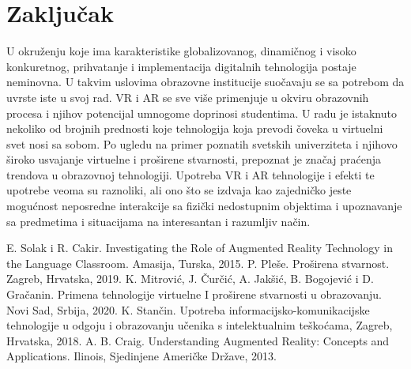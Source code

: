 \documentclass[a4paper]{article}
\begin{document}
	\section{Zaključak}
	\label{sec:Zaključak}
	U okruženju koje ima karakteristike globalizovanog, dinamičnog i visoko  konkuretnog, prihvatanje i implementacija digitalnih 
	tehnologija postaje neminovna. U takvim uslovima obrazovne institucije suočavaju se sa potrebom da uvrste iste u svoj rad. VR i AR se sve više primenjuje
	u okviru obrazovnih procesa i njihov potencijal umnogome doprinosi studentima. U radu je istaknuto nekoliko od brojnih prednosti koje tehnologija koja prevodi
	čoveka u virtuelni svet nosi sa sobom. Po ugledu na primer poznatih svetskih univerziteta i njihovo široko usvajanje virtuelne i proširene stvarnosti, prepoznat 
	je značaj praćenja trendova u obrazovnoj tehnologiji. Upotreba VR i AR tehnologije i efekti te upotrebe veoma su raznoliki, ali ono što se izdvaja kao zajedničko 
	jeste mogućnost neposredne interakcije sa fizički nedostupnim objektima i upoznavanje sa predmetima i situacijama na interesantan i razumljiv način.
	

        
        \begin{thebibliography}{9}
         E. Solak i R. Cakir. Investigating the Role of Augmented Reality Technology in the Language Classroom. Amasija, 
	Turska, 2015.
         P. Pleše. Proširena stvarnost. Zagreb, Hrvatska, 2019.
         K. Mitrović, J. Čurčić, A. Jakšić, B. Bogojević i D. Gračanin. Primena tehnologije virtuelne I proširene 
	stvarnosti u obrazovanju. Novi Sad, Srbija, 2020.
         K. Stančin. Upotreba informacijsko-komunikacijske tehnologije u odgoju i obrazovanju učenika s 
	intelektualnim teškoćama, Zagreb, Hrvatska, 2018.
         A. B. Craig. Understanding Augmented Reality: Concepts and Applications. Ilinois, Sjedinjene Američke 
	Države, 2013.
 
        \end{thebibliography}
\end{document}
